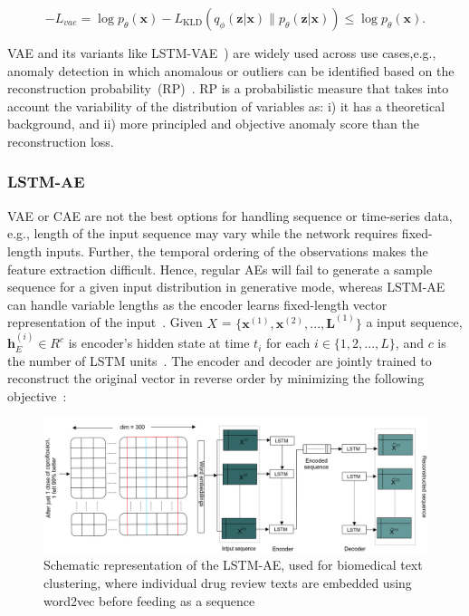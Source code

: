 \begin{equation}
    -L_{vae}=\log p_{\theta}(\mathbf{x})-L_{\mathrm{KLD}}\left(q_{\phi}(\mathbf{z}|\mathbf{x}) \| p_{\theta}(\mathbf{z}|\mathbf{x})\right) \leq \log p_{\theta}(\mathbf{x}). 
    \label{eq:lvae}
\end{equation}

\hspace*{3.5mm} VAE and its variants like LSTM-VAE~\cite{park2018multimodal}) are widely used across use cases,e.g., anomaly detection in which anomalous or outliers can be identified based on the reconstruction probability~(RP)~\cite{an2015variational}. RP is a probabilistic measure that takes into account the variability of the distribution of variables as: i) it has a theoretical background, and ii) more principled and objective anomaly score than the reconstruction loss. 

\subsubsection{LSTM-AE}
VAE or CAE are not the best options for handling sequence or time-series data, e.g., length of the input sequence may vary while the network requires fixed-length inputs. Further, the temporal ordering of the observations makes the feature extraction difficult. Hence, regular AEs will fail to generate a sample sequence for a given input distribution in generative mode, whereas LSTM-AE can handle variable lengths as the encoder learns fixed-length vector representation of the input~\cite{KarimNCCA2019,karim2019drug}. Given $X$ = $\{\mathbf{x}^{(1)},\mathbf{x}^{(2)}, ..., \mathbf{L}^{(1)}\}$ a input sequence, $\mathbf{h}_E^{(i)} \in {R}^c$ is encoder's hidden state at time $t_i$ for each $i \in \{1,2,...,L\}$, and $c$ is the number of LSTM units~\cite{LSTM_Autoencoder}. The encoder and decoder are jointly trained to reconstruct the original vector in reverse order by minimizing the following objective~\cite{zhu2018hidden}:  

\begin{figure}[h]
	\centering
	\includegraphics[scale=0.5]{images/lstm_ae_v2.PNG}
    \caption[Schematic representation of the LSTM-autoencoder]{Schematic representation of the LSTM-AE, used for biomedical text clustering, where individual drug review texts are embedded using word2vec before feeding as a sequence~\cite{karimBIB2019}}	
	\label{fig:lstm_ae}
	\vspace{-2mm} 
\end{figure}

